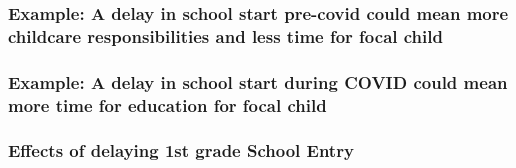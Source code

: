 \documentclass{beamer}
\begin{document}
\begin{frame}
    \label{update_scott}
    \frametitle{Example: A delay in school start pre-covid could mean more childcare responsibilities and less time for focal child}
 {
    }
\end{frame}



\begin{frame}
    \label{update_scott}
    \frametitle{Example: A delay in school start during COVID could mean more time for education for focal child}
 {
    }
\end{frame}


\begin{frame}
    \frametitle{Effects of delaying 1st grade School Entry}
    
\end{frame}
\end{document}
